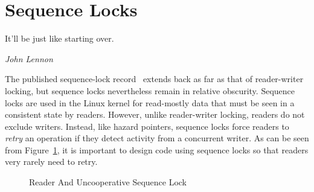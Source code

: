 
\section{Sequence Locks}
\label{sec:defer:Sequence Locks}
%
\epigraph{It'll be just like starting over.}{\emph{John Lennon}}

The published sequence-lock
record~\cite{10.1145/800212.806505,10.1145/359863.359878}
extends back as far as that of reader-writer locking, but sequence locks
nevertheless remain in relative obscurity.
Sequence locks are used in the Linux kernel for read-mostly data that
must be seen in a consistent state by readers.
However, unlike reader-writer locking, readers do not exclude writers.
Instead, like hazard pointers, sequence locks force readers to
\emph{retry} an operation if they detect activity from a concurrent writer.
As can be seen from
Figure~\ref{fig:defer:Reader And Uncooperative Sequence Lock},
it is important to design code using sequence locks so that readers
very rarely need to retry.

\begin{figure}[tb]
\centering
{}
\caption{Reader And Uncooperative Sequence Lock}
\label{fig:defer:Reader And Uncooperative Sequence Lock}
\end{figure}

